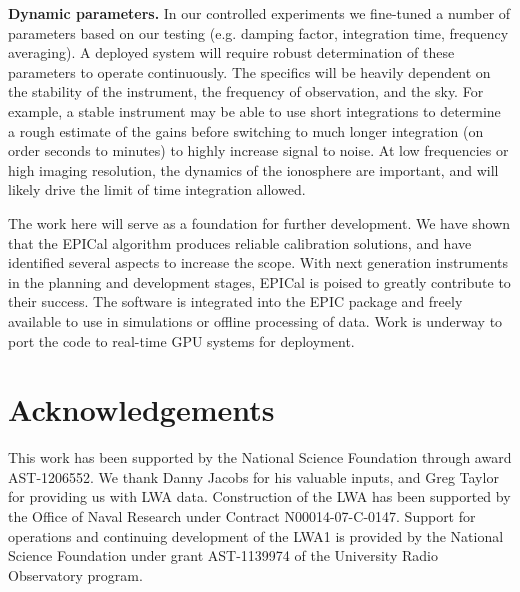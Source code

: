 \documentclass[a4paper,fleqn,usenatbib]{mnras}
\begin{document}
\textbf{Dynamic parameters.} In our controlled experiments we fine-tuned a number of 
parameters based on our testing (e.g. damping factor, integration time, frequency averaging). A 
deployed system will require robust determination of these parameters to operate continuously. 
The specifics will be heavily dependent on the stability of the instrument, the frequency of 
observation, and the sky. For example, a stable instrument may be able to use short 
integrations to determine a rough estimate of the gains before switching to much longer 
integration (on order seconds to minutes) to highly increase signal to noise. At low frequencies 
or high imaging resolution, the dynamics of the ionosphere are important, and will likely drive 
the limit of time integration allowed.

The work here will serve as a foundation for further development. We have shown that the 
EPICal algorithm produces reliable calibration solutions, and have identified several aspects to 
increase the scope. With next generation instruments in the planning and development stages, 
EPICal is poised to greatly contribute to their success. The software is integrated into the EPIC 
package and freely available to use in simulations or offline processing of data. Work is 
underway to port the code to real-time GPU systems for deployment. 

\section*{Acknowledgements}
This work has been supported by the National Science Foundation through award 
AST-1206552. We thank Danny Jacobs for his valuable inputs, and Greg Taylor for providing 
us with LWA data. Construction of the LWA has been supported by the Office of Naval 
Research under Contract N00014-07-C-0147. Support for operations and continuing 
development of the LWA1 is provided by the National Science Foundation under grant 
AST-1139974 of the University Radio Observatory program.






%

\bsp	%
\label{lastpage}
\end{document}
